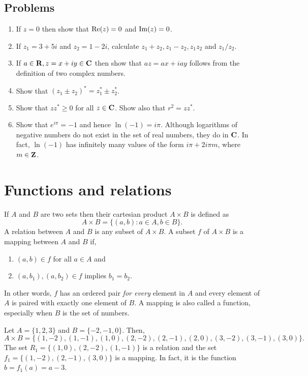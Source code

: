 \subsection{Problems}
\begin{enumerate}
\item If $z = 0$ then show that $\operatorname{Re}(z) = 0$ and $\operatorname{Im}(z) = 0$.
\item If $z_1 = 3 + 5i$ and $z_2 = 1 - 2i$, calculate $z_1 + z_2, z_1 - z_2, 
z_1z_2$ and $z_1/z_2$.
\item If $a \in \mathbf{R}, z = x + iy \in \mathbf{C}$ then show that $az = ax + iay$ 
follows from
the definition of two complex numbers.
\item Show that $(z_1 \pm z_2)^\ast = z_1^\ast \pm z_2^\ast$.
\item Show that $zz^\ast \ge 0$ for all $z \in \mathbf{C}$. Show also that $r^2 = 
zz^\ast$.
\item Show that $e^{i\pi} = -1$ and hence $\ln(-1) = i\pi$. Although logarithms 
of negative numbers do not exist in the set of real numbers, they do in $\mathbf{C}$. 
In fact, $\ln(-1)$ has infinitely many values of the form $i\pi + 2i\pi m$, 
where 
$m \in \mathbf{Z}$.
\end{enumerate}

\section{Functions and relations}\label{c1s4}
If $A$ and $B$ are two sets then their cartesian product $A \times B$ is 
defined as 
\begin{equation}\label{c1s4e1}
A \times B = \{(a, b) : a \in A, b \in B\}.
\end{equation}
A relation between $A$ and $B$ is any subset of $A \times B$. A subset $f$
of $A \times B$ is a mapping between $A$ and $B$ if,
\begin{enumerate}
\item $(a, b) \in f$ for all $a \in A$ and
\item $(a, b_1), (a, b_2) \in f$ implies $b_1 = b_2$.
\end{enumerate}
In other words, $f$ has an ordered pair \emph{for every} element in $A$ and
every element of $A$ is paired with exactly one element of $B$. A mapping is
also called a function, especially when $B$ is the set of numbers.

Let $A = \{1, 2, 3\}$ and $B = \{-2, -1, 0\}$. Then, 
\[
A \times B = \{(1, -2), (1, -1), (1, 0), (2, -2), (2, -1), (2, 0),
                (3, -2), (3, -1), (3, 0)\}.
\]
The set $R_1 = \{(1, 0), (2, -2), (1, -1)\}$ is a relation and the set $f_1 = 
\{(1, -2), (2, -1), (3, 0)\}$ is a mapping. In fact, it is the function $b = 
f_1(a) = a - 3$.

